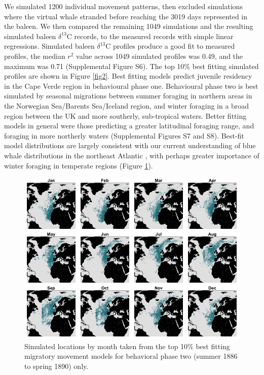 \documentclass[a4paper,12pt]{article}
\begin{document}
We simulated 1200 individual movement patterns, then excluded simulations where the virtual whale stranded before reaching the 3019 days represented in the baleen.
We then compared the remaining 1049 simulations and the resulting simulated baleen $\delta^{13}$C records, to the measured records with simple linear regressions. 
Simulated baleen $\delta^{13}$C profiles produce a good fit to measured profiles, the median $r^2$ value across 1049 simulated profiles was 0.49, and the maximum was 0.71 (Supplemental Figure S6).
The top 10\% best fitting simulated profiles are shown in Figure \ref{fig2}. 
Best fitting models predict juvenile residency in the Cape Verde region in behavioural phase one. 
Behavioural phase two is best simulated by seasonal migrations between summer foraging in northern areas in the Norwegian Sea/Barents Sea/Iceland region, and winter foraging in a broad region between the UK and more southerly, sub-tropical waters. 
Better fitting models in general were those predicting a greater latitudinal foraging range, and foraging in more northerly waters (Supplemental Figures S7 and S8).
Best-fit model distributions are largely consistent with our current understanding of blue whale distributions in the northeast Atlantic \cite{reeves2004historical,baines2014upwellings,baines2017autumn,reeves2004historical}, with perhaps greater importance of winter foraging in temperate regions (Figure \ref{fig4}).

\begin{figure}
 \centering
  \includegraphics[width = \linewidth]{figures/Figure-4-monthly.png}
  \caption{Simulated locations by month taken from the top 10\% best fitting migratory movement models for behavioral phase two (summer 1886 to spring 1890) only.}
  \label{fig4}
\end{figure}
\end{document}
